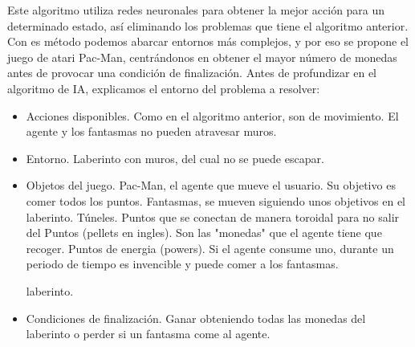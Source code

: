 		Este algoritmo utiliza redes neuronales para obtener la mejor acción para un determinado estado, así eliminando los problemas que tiene el algoritmo anterior. Con es método podemos abarcar entornos más complejos, y por eso se propone el juego de atari Pac-Man, centrándonos en obtener el mayor número de monedas antes de provocar una condición de finalización. Antes de profundizar en el algoritmo de IA, explicamos el entorno del problema a resolver:
		\vspace{-0.5cm}
		\begin{itemize}		
			\item Acciones disponibles. Como en el algoritmo anterior, son de movimiento. El agente y los fantasmas no pueden atravesar muros.
			\vspace*{-0.2cm}
			\item Entorno. Laberinto con muros, del cual no se puede escapar.
			\item Objetos del juego. 
			\vspace*{-0.3cm}
				\subitem Pac-Man, el agente que mueve el usuario. Su objetivo es comer todos los puntos.
				\vspace*{-0.3cm}
				\subitem Fantasmas, se mueven siguiendo unos objetivos en el laberinto.
				\vspace*{-0.3cm}
				\subitem Túneles. Puntos que se conectan de manera toroidal para no salir del
				\vspace*{-0.3cm}
				\subitem Puntos (pellets en ingles). Son las "monedas" que el agente tiene que recoger.
				\vspace*{-0.3cm}
				\subitem Puntos de energia (powers). Si el agente consume uno, durante un periodo de tiempo es invencible y puede comer a los fantasmas.
				
				 laberinto.				
			\vspace*{-0.3cm}
			\item Condiciones de finalización. Ganar obteniendo todas las monedas del laberinto o perder si un fantasma come al agente. 			
		\end{itemize}
		
